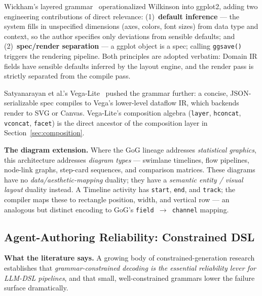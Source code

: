 Wickham's layered grammar~\cite{layeredgrammar2010} operationalized Wilkinson
into ggplot2, adding two engineering contributions of direct relevance:
(1)~\textbf{default inference} --- the system fills in unspecified dimensions
(axes, colors, font sizes) from data type and context, so the author
specifies only deviations from sensible defaults; and (2)~\textbf{spec/render
separation} --- a ggplot object is a spec; calling \texttt{ggsave()} triggers
the rendering pipeline.
Both principles are adopted verbatim: Domain IR fields have sensible defaults
inferred by the layout engine, and the render pass is strictly separated from
the compile pass.

Satyanarayan et al.'s Vega-Lite~\cite{vegalite2017} pushed the grammar further:
a concise, JSON-serializable spec compiles to Vega's lower-level dataflow IR,
which backends render to SVG or Canvas.
Vega-Lite's composition algebra (\texttt{layer}, \texttt{hconcat},
\texttt{vconcat}, \texttt{facet}) is the direct ancestor of the composition
layer in Section~\ref{sec:composition}.

\medskip\noindent
\textbf{The diagram extension.}
Where the GoG lineage addresses \emph{statistical graphics}, this architecture
addresses \emph{diagram types} --- swimlane timelines, flow pipelines, node-link
graphs, step-card sequences, and comparison matrices.
These diagrams have no \emph{data/aesthetic-mapping} duality; they have a
\emph{semantic entity / visual layout} duality instead.
A Timeline activity has \texttt{start}, \texttt{end}, and \texttt{track};
the compiler maps these to rectangle position, width, and vertical row ---
an analogous but distinct encoding to GoG's \texttt{field $\to$ channel}
mapping.

\subsection{Agent-Authoring Reliability: Constrained DSL}
\label{sec:grammar-llm}

\textbf{What the literature says.}
A growing body of constrained-generation research establishes that
\emph{grammar-constrained decoding is the essential reliability lever for
LLM-DSL pipelines}, and that small, well-constrained grammars lower the
failure surface dramatically.

